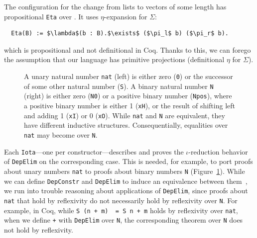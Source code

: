 The configuration for the change from lists to vectors of some length has propositional \lstinline{Eta} over \B.
It uses $\eta$-expansion for $\Sigma$:

\begin{lstlisting}
  Eta(B) := $\lambda$(b : B).$\exists$ ($\pi_l$ b) ($\pi_r$ b).
\end{lstlisting}
which is propositional and not definitional in Coq.
Thanks to this, we can forego the assumption that our language has primitive projections (definitional $\eta$ for $\Sigma$).

\begin{figure}
\begin{minipage}{0.44\columnwidth}
   
\end{minipage}
\hfill
\begin{minipage}{0.54\columnwidth}
   
\end{minipage}
\caption{A unary natural number \lstinline{nat} (left) is either zero (\lstinline{0}) or the successor of some other natural number (\lstinline{S}).
A binary natural number \lstinline{N} (right) is either zero (\lstinline{N0}) or a positive binary number (\lstinline{Npos}), where a positive binary number is either 1 (\lstinline{xH}), or the result of shifting left and adding 1 (\lstinline{xI}) or
0 (\lstinline{xO}). While \lstinline{nat} and \lstinline{N} are equivalent, they have different inductive structures.
Consequentially,  equalities over \lstinline{nat} may become  over \lstinline{N}.}
\label{fig:nattobin}
\end{figure}

Each \lstinline{Iota}---one per constructor---describes and proves the $\iota$-reduction behavior
of \lstinline{DepElim} on the corresponding case.
This is needed, for example, to port proofs about unary numbers \lstinline{nat} to
proofs about binary numbers \lstinline{N} (Figure~\ref{fig:nattobin}).
While we can define \lstinline{DepConstr} and \lstinline{DepElim} to induce an equivalence
between them~\href{https://github.com/uwplse/pumpkin-pi/blob/v2.0.0/plugin/coq/nonorn.v}{}, %
we run into trouble reasoning about applications of \lstinline{DepElim},
since proofs about \lstinline{nat} that hold by reflexivity do not necessarily hold by reflexivity over \lstinline{N}. 
For example, in Coq, while \lstinline{S (n + m)  = S n + m} holds by reflexivity over \lstinline{nat},
when we define \lstinline{+} with \lstinline{DepElim} over \lstinline{N},
the corresponding theorem over \lstinline{N} does not hold by reflexivity.


